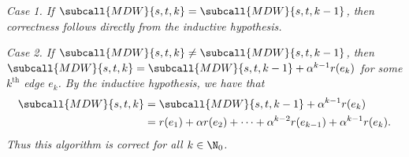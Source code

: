 \documentclass{article}
\begin{document}
\begin{solution}
\begin{subproof}[Correctness.]
\it{Case 1.} If \( \subcall{MDW}{s,t,k}=\subcall{MDW}{s,t,k-1} \), then correctness follows directly from the inductive hypothesis.

\it{Case 2.} If \( \subcall{MDW}{s,t,k}\neq \subcall{MDW}{s,t,k-1} \), then \( \subcall{MDW}{s,t,k}=\subcall{MDW}{s,t,k-1}+\alpha^{k-1}r(e_k) \) for some \( k^{\text{th}} \) edge \( e_k \). By the inductive hypothesis, we have that \begin{align*}
\subcall{MDW}{s,t,k}&=\subcall{MDW}{s,t,k-1}+\alpha^{k-1}r(e_k) \\
&= r(e_1) + \alpha r(e_2)+ \cdots + \alpha^{k-2} r(e_{k-1}) +\alpha^{k-1}r(e_k).
\end{align*}
Thus this algorithm is correct for all \( k\in \N_0 \).
\end{subproof}
\end{solution}
\end{document}

